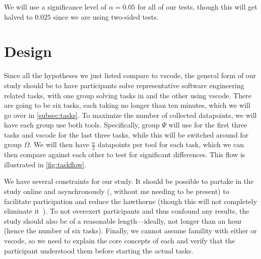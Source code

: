 \documentclass[../thesis]{subfiles}
\begin{document}
We will use a significance level of $\alpha = 0.05$ for all of our tests, though this will get halved to $0.025$ since we are using two-sided tests.

\section{Design}\label{sec:design}
Since all the hypotheses we just listed compare \SEE{} to \gls{vscode}, the general form of our study should be to have participants solve representative software engineering related tasks, with one group solving tasks in \SEE{} and the other using \gls{vscode}.
There are going to be six tasks, each taking no longer than ten minutes, which we will go over in \cref{subsec:tasks}.
To maximize the number of collected datapoints, we will have each group use both tools.
Specifically, group $\Psi$ will use \SEE{} for the first three tasks and \gls{vscode} for the last three tasks, while this will be switched around for group $\Omega$.
We will then have $\frac{n}{2}$ datapoints per tool for each task, which we can then compare against each other to test for significant differences.
This flow is illustrated in \cref{fig:taskflow}.

We have several constraints for our study.
It should be possible to partake in the study online and asynchronously (\ie, without me needing to be present) to facilitate participation and reduce the \gls{hawthorne} (though this will not completely eliminate it~\cite[\eg][]{evans2010}).
To not overexert participants and thus confound any results, the study should also be of a reasonable length---ideally, not longer than an hour (hence the number of six tasks).
Finally, we cannot assume famility with either \SEE{} or \gls{vscode}, so we need to explain the core concepts of each and verify that the participant understood them before starting the actual tasks.
\end{document}
